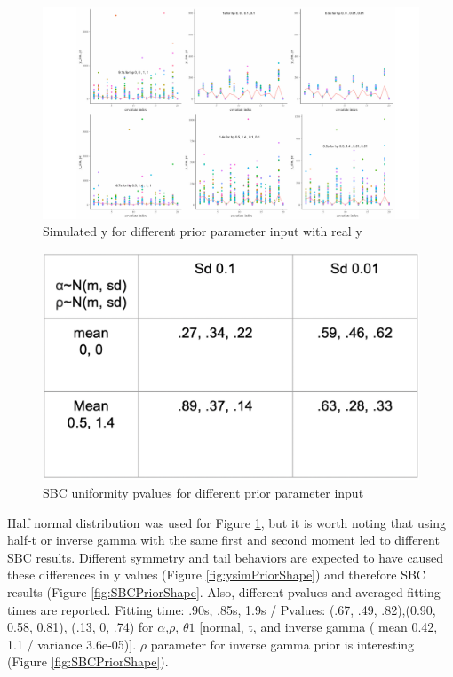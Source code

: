 \documentclass{article}
\begin{document}
  
  \begin{figure}[!htb]
  \centering
    \includegraphics[width=\textwidth]{writeup/figures/y_sim_prior_param.pdf}
    \caption{Simulated y for different prior parameter input with real y}
    \label{fig:ysimPriorParam}
  \end{figure}
  
  
   \begin{figure}[!htb]
    \centering
    \includegraphics[width=\textwidth]{writeup/figures/diseasemap_pval.png}
    \caption{SBC uniformity pvalues for different prior parameter input}
    \label{fig:pvalPriorParam}
  \end{figure}
  
  
Half normal distribution was used for Figure \ref{fig:ysimPriorParam}, but it is worth noting that using half-t or inverse gamma with the same first and second moment led to different SBC results. Different symmetry and tail behaviors are expected to have caused these differences in y values (Figure \ref{fig:ysimPriorShape}) and therefore SBC results  (Figure \ref{fig:SBCPriorShape}. Also, different pvalues and averaged fitting times are reported. Fitting time: .90s, .85s, 1.9s / Pvalues: (.67, .49, .82),(0.90, 0.58, 0.81), (.13, 0, .74) for $\alpha$,$\rho$, $\theta1$ [normal, t, and inverse gamma ( mean 0.42, 1.1 / variance 3.6e-05)]. $\rho$ parameter for inverse gamma prior is interesting (Figure \ref{fig:SBCPriorShape}).
\end{document}
